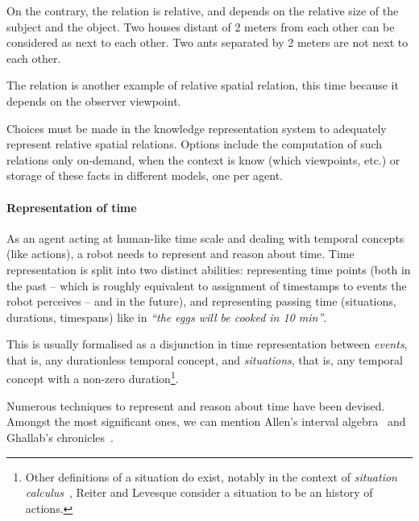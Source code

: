 On the contrary, the relation  is relative, and depends on the
relative size of the subject and the object. Two houses distant of 2 meters
from each other can be considered as next to each other. Two ants separated by
2 meters are not next to each other.

The relation  is another example of relative spatial relation,
this time because it depends on the observer viewpoint.


Choices must be made in the knowledge representation system to adequately
represent relative spatial relations. Options include the computation of such
relations only on-demand, when the context is know (which viewpoints, etc.) or
storage of these facts in different models, one per agent.


\paragraph{Representation of time}
\label{sect|time-representation}

As an agent acting at human-like time scale and dealing with temporal concepts
(like actions), a robot needs to represent and reason about
time. Time representation is split into two distinct abilities: representing
time points (both in the past -- which is roughly equivalent to assignment of
timestamps to events the robot perceives -- and in the future), and
representing passing time (situations, durations, timespans) like in
\emph{``the eggs will be cooked in 10 min''}.

This is usually formalised as a disjunction in time representation between
\emph{events}, that is, any durationless temporal concept, and
\emph{situations}, that is, any temporal concept with a non-zero
duration\footnote{Other definitions of a situation do exist, notably in the
context of \emph{situation calculus}~\cite{Levesque1998}, Reiter and Levesque
consider a situation to be an history of actions.}.

Numerous techniques to represent and reason about time have been devised.
Amongst the most significant ones, we can mention Allen's interval
algebra~\cite{Allen1984} and Ghallab's chronicles~\cite{Ghallab1996}.



